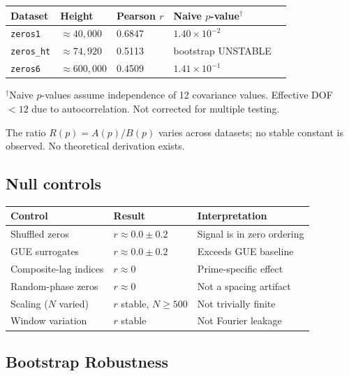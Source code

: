 \documentclass[11pt]{article}
\begin{document}
\begin{center}
\begin{tabular}{lllll}
\toprule
Dataset & Height & Pearson $r$ & Naive $p$-value$^\dagger$ \\
\midrule
\texttt{zeros1} & $\approx 40{,}000$ & 0.6847 & $1.40\times10^{-2}$ \\
\texttt{zeros\_ht} & $\approx 74{,}920$ & 0.5113 & bootstrap UNSTABLE \\
\texttt{zeros6} & $\approx 600{,}000$ & 0.4509 & $1.41\times10^{-1}$ \\


\bottomrule
\end{tabular}

\medskip\small $^\dagger$Naive $p$-values assume independence of 12 covariance values.
Effective DOF $<12$ due to autocorrelation. Not corrected for multiple testing.
\end{center}

The ratio $R(p) = A(p)/B(p)$ varies across datasets; no stable constant is observed. No theoretical derivation exists.

\subsection{Null controls}

\begin{center}
\begin{tabular}{lll}
\toprule
Control & Result & Interpretation \\
\midrule
Shuffled zeros        & $r \approx 0.0 \pm 0.2$ & Signal is in zero ordering \\
GUE surrogates        & $r \approx 0.0 \pm 0.2$ & Exceeds GUE baseline \\
Composite-lag indices & $r \approx 0$           & Prime-specific effect \\
Random-phase zeros    & $r \approx 0$           & Not a spacing artifact \\
Scaling ($N$ varied)  & $r$ stable, $N\geq500$  & Not trivially finite \\
Window variation      & $r$ stable              & Not Fourier leakage \\
\bottomrule
\end{tabular}
\end{center}


\subsection{Bootstrap Robustness}
\end{document}
